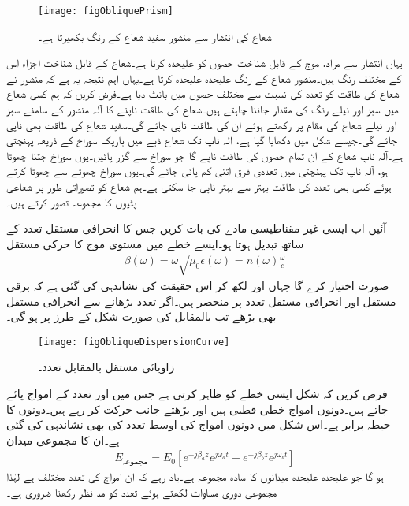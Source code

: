 \begin{figure}
\centering
\texttt{[image: figObliquePrism]}
\caption{شعاع کی انتشار سے منشور سفید شعاع کے رنگ بکھیرتا ہے۔}
\label{شکل_ترچھی_انتشار_بذریعہ_منشور}
\end{figure}
یہاں انتشار سے مراد، موج کے قابل شناخت حصوں کو علیحدہ کرنا ہے۔شعاع کے قابل شناخت اجزاء اس کے مختلف رنگ ہیں۔منشور شعاع کے رنگ علیحدہ علیحدہ کرتا ہے۔یہاں اہم نتیجہ یہ ہے کہ منشور نے شعاع کی طاقت کو تعدد کی نسبت سے مختلف حصوں میں بانٹ دیا ہے۔فرض کریں کہ ہم کسی شعاع میں سبز اور نیلے رنگ کی مقدار جاننا چاہتے ہیں۔شعاع کی طاقت ناپنے کا آلہ منشور کے سامنے سبز اور نیلے شعاع کی مقام پر رکھتے ہوئے ان کی طاقت ناپی جائے گی۔سفید شعاع کی طاقت بھی ناپی جائے گی۔جیسے شکل میں دکھایا گیا ہے، آلہ ناپ تک شعاع ڈبے میں باریک سوراخ کے ذریعہ پہنچتی ہے۔آلہ ناپ شعاع کے ان تمام حصوں کی طاقت ناپے گا جو سوراخ سے گزر پائیں۔یوں سوراخ جتنا چھوٹا ہو، آلہ ناپ تک پہنچتی  میں تعددی فرق اتنی کم پائی جائے گی۔یوں سوراخ چھوٹے سے چھوٹا کرتے ہوئے کسی بھی تعدد کی طاقت بہتر سے بہتر ناپی جا سکتی ہے۔ہم شعاع کو تصوراتی طور پر شعاعی پٹیوں کا مجموعہ تصور کرتے ہیں۔

آئیں اب ایسی غیر مقناطیسی مادے کی بات کریں جس کا انحرافی مستقل تعدد کے ساتھ تبدیل ہوتا ہو۔ایسے خطے میں مستوی موج کا حرکی مستقل
\begin{align}
\beta(\omega)=\omega\sqrt{\mu_0 \epsilon\left(\omega\right)}=n(\omega)\frac{\omega}{c}
\end{align}
صورت اختیار کرے گا جہاں  اور  لکھ کر اس حقیقت کی نشاندہی کی گئی ہے کہ برقی مستقل اور انحرافی مستقل تعدد پر منحصر ہیں۔اگر تعدد بڑھانے سے انحرافی مستقل  بھی بڑھے تب  بالمقابل  کی صورت شکل  کے طرز پر ہو گی۔
\begin{figure}
\centering
\texttt{[image: figObliqueDispersionCurve]}
\caption{زاویائی مستقل بالمقابل تعدد۔}
\label{شکل_ترچھی_حرکی_مستقل_بالمقابل_تعدد_خط}
\end{figure}

فرض کریں کہ شکل  ایسی خطے کو ظاہر کرتی ہے جس میں  اور  تعدد کے امواج پائے جاتے ہیں۔دونوں  امواج  خطی قطبی ہیں اور بڑھتے  جانب حرکت کر رہے ہیں۔دونوں کا حیطہ برابر ہے۔اس شکل میں دونوں امواج کی اوسط تعدد  کی بھی نشاندہی کی گئی ہے۔ان کا مجموعی میدان
\begin{align}\label{مساوات_ترچھی_انتشار_الف}
E_{\text{مجموعہ}}=E_0\left[e^{-j \beta_a z}e^{j \omega_a t}+e^{-j \beta_b z}e^{j \omega_b t}\right]
\end{align}
ہو گا جو علیحدہ علیحدہ میدانوں کا سادہ مجموعہ ہے۔یاد رہے کہ ان امواج کی تعدد مختلف ہے لہٰذا مجموعی دوری مساوات لکھتے ہوئے تعدد کو مد نظر رکھنا ضروری ہے۔

